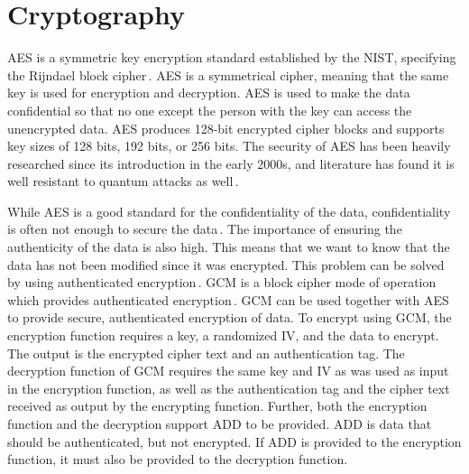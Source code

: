 \section{Cryptography}
\label{sec:back_crypto}
\gls{AES} is a symmetric key encryption standard established by the \gls{NIST}, specifying the Rijndael block cipher\,\cite{kumarvermaPerformanceAnalysisRC62012}. \gls{AES} is a symmetrical cipher, meaning that the same key is used for encryption and decryption. \gls{AES} is used to make the data confidential so that no one except the person with the key can access the unencrypted data. \gls{AES} produces \mbox{128-bit} encrypted cipher blocks and supports key sizes of 128 bits, 192 bits, or 256 bits. The security of \gls{AES} has been heavily researched since its introduction in the early 2000s, and literature has found it is well resistant to quantum attacks as well\,\cite{bonnetainQuantumSecurityAnalysis2019}.

While \gls{AES} is a good standard for the confidentiality of the data, confidentiality is often not enough to secure the data\,\cite{rosswallrabensteinWhenItComes2021}. The importance of ensuring the authenticity of the data is also high. This means that we want to know that the data has not been modified since it was encrypted. This problem can be solved by using authenticated encryption\,\cite{khovratovichAnswerWhyShould2013}. \gls{GCM} is a block cipher mode of operation which provides authenticated encryption\,\cite{mcgrewGaloisCounterMode2004}. \gls{GCM} can be used together with \gls{AES} to provide secure, authenticated encryption of data. To encrypt using \gls{GCM}, the encryption function requires a key, a randomized \gls{IV}, and the data to encrypt. The output is the encrypted cipher text and an authentication tag. The decryption function of \gls{GCM} requires the same key and \gls{IV} as was used as input in the encryption function, as well as the authentication tag and the cipher text received as output by the encrypting function. Further, both the encryption function and the decryption support \gls{ADD} to be provided. \gls{ADD} is data that should be authenticated, but not encrypted. If \gls{ADD} is provided to the encryption function, it must also be provided to the decryption function.

